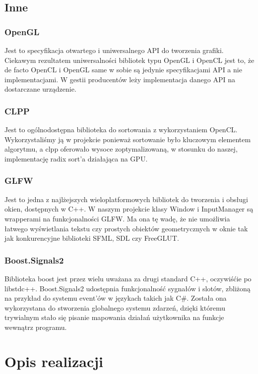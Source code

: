 \documentclass[polish, 12pt]{aghthesis}
\begin{document}
\subsection{Inne}

	\subsubsection*{OpenGL}
			Jest to specyfikacja otwartego i uniwersalnego API do tworzenia grafiki. Ciekawym rezultatem uniwersalności bibliotek typu OpenGL i OpenCL jest to, że de facto OpenCL i OpenGL same w sobie są jedynie specyfikacjami API a nie implementacjami. W gestii producentów leży implementacja danego API na dostarczane urządzenie.

\subsubsection*{CLPP}
			 Jest to ogólnodostępna biblioteka do sortowania z wykorzystaniem OpenCL. Wykorzystaliśmy ją w projekcie ponieważ sortowanie było kluczowym elementem algorytmu, a clpp oferowało wysoce zoptymalizowaną, w stosunku do naszej, implementację radix sort'a działająca na GPU.

\subsubsection*{GLFW}
			 Jest to jedna z najlżejszych wieloplatformowych bibliotek do tworzenia i obsługi okien, dostępnych w C++. W naszym projekcie klasy Window i InputManager są wrapperami na funkcjonalności GLFW. Ma ona tę wadę, że nie umożliwia łatwego wyświetlania tekstu czy prostych obiektów geometrycznych w oknie tak jak konkurencyjne biblioteki SFML, SDL czy FreeGLUT. 

\subsubsection*{Boost.Signals2}
			 Biblioteka boost jest przez wielu uważana za drugi standard C++, oczywiśćie po libstdc++. Boost.Signals2 udostępnia funkcjonalność sygnałów i slotów, zbliżoną na przykład do systemu event'ów w językach takich jak C\#. Została ona wykorzystana do stworzenia globalnego systemu zdarzeń, dzięki któremu trywialnym stało się pisanie mapowania działań użytkownika na funkcje wewnątrz programu. 


\section{Opis realizacji}
\end{document}
